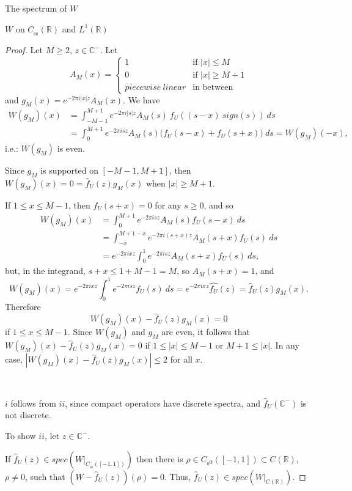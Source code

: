 \documentclass[12pt]{article}
\begin{document}
\begin{section}{The spectrum of $W$ }
\begin{subsection}{$W$ on $C_{_{0\!0}}(\mathbb{R})$ and $L^1(\mathbb{R})$}
\begin{proof} 
Let $M \ge 2$, $z \in \mathbb{C}^-$. Let 
$$
A_M(x)=
\begin{cases}
1  & \text{if } |x| \le M \\
0  & \text{if } |x| \ge M +1\\
piecewise \  linear & \text{in between}
\end{cases} 
$$ 
and $g_M(x) = e^{-2 \pi i |x| z} A_M(x)$. We have  
\begin{align*}
W(g_M)(x) &= \int_{-M-1}^{M+1} e^{-2 \pi i |s| z} A_M(s) \ f_U\!\left(  \left(s - x \right)\ sign(s) \right) \ ds \\
		&= \int_0^{M+1} e^{-2 \pi i s z} A_M(s) 
		\Big( f_U\!(  s - x ) + f_U\!(  s + x ) \Big) \ ds = W(g_M)(-x),
\end{align*} 
i.e.: $W(g_M)$ is even.  


Since $g_M$ is supported on $[-M-1,M+1]$, then $W(g_M)(x) = 0 = \hat{f}_U(z) g_M(x) $ when $|x| \ge M+1$.  

If $1 \le x \le M -1 $, then $f_U\!(  s + x ) = 0$ for any $s \ge 0$, and so
\begin{align*}
W(g_M)(x) &= \int_0^{M+1} e^{-2 \pi i s z} A_M(s) f_U\!(  s - x )  \ ds \\
 & = \int_{-x}^{M+1 - x} e^{-2 \pi i (s+x) z} A_M(s+x) f_U\!(  s  )  \ ds \\
 & = e^{-2 \pi i x z} \int_0^1 e^{-2 \pi i s z} A_M(s+x) f_U\!(  s  )  \ ds,
\end{align*}
but, in the integrand, $s+x \le 1 + M-1=M$, so $A_M(s+x)=1$, and
$$
W(g_M)(x) = e^{-2 \pi i x z} \int_0^1 e^{-2 \pi i s z} f_U\!(  s  )  \ ds 
= e^{-2 \pi i x z} \hat{f_U}(z) = \hat{f}_U(z) g_M(x).
$$
Therefore
$$
W(g_M)(x) - \hat{f}_U(z) g_M(x) = 0
$$
if $1 \le x \le M-1$. Since $W(g_M)$ and $g_M$ are even, it follows that $W(g_M)(x) - \hat{f}_U(z) g_M(x) = 0 $
if $1 \le |x| \le M-1$ or $M+1 \le |x|$. In any case, $|W(g_M)(x) - \hat{f}_U(z) g_M(x)| \le 2$ for all $x$.  

\  
\  


$i$ follows from $ii$, since compact operators have discrete spectra, and $\hat{f}_U(\mathbb{C}^-)$ is not discrete.

To show $ii$, let $z \in \mathbb{C}^-$.  

If $\hat{f}_U(z) \in spec\left(W\Big|_{C_{_{0\!0}}([-1,1])}   \right) $  then there is $\rho \in C_{_0\!0}([-1,1]) \subset C(\mathbb{R})$, $\rho \ne 0$, such that $(W - \hat{f}_U(z))(\rho) = 0$. Thus, $\hat{f}_U(z) \in spec\left(W\Big|_{C(\mathbb{R})}   \right) $. 


\end{proof}
\end{subsection}
\end{section}
\end{document}
